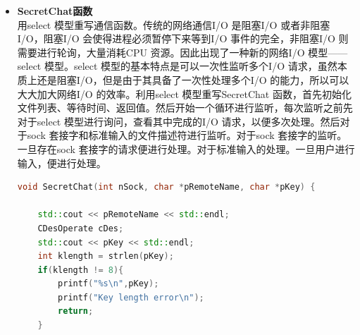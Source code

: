 \documentclass[UTF8,a4paper,10pt]{ctexart}
\begin{document}
\begin{itemize}
\begin{lstlisting}[language = C++]
      //negotiate key
      PublicKey cRsaPublicKey;
      CRsaOperate CRsaOperate;
      //CRsaOperate.show_par();
      cRsaPublicKey = CRsaOperate.GetPublicKey();
      if(send(nAcceptSocket, (char *)(&cRsaPublicKey), sizeof(cRsaPublicKey), 0) != sizeof(cRsaPublicKey)){
          perror("send");
          exit(0);
      }else{
          printf("successful send the RSA public key. \n");
      }
      unsigned long long nEncryptDesKey[4];
      char *strDesKey = new char[8];
      if(4*sizeof(unsigned long long) != TotalRecv(nAcceptSocket,(char *)nEncryptDesKey, 4*sizeof(unsigned long long),0)) {
          perror("TotalRecv DES key error");
          exit(0);
      }
      else {
          printf("successful get the DES key\n");
          unsigned short * pDesKey = (unsigned short *)strDesKey;
          for(int i = 0;i < 4; i++) {
              pDesKey[i] = CRsaOperate.Decry(nEncryptDesKey[i]);
              //cout << pDesKey[i] << endl;
          }
      }
      
      printf("Begin to chat...\n");
      SecretChat(nAcceptSocket,inet_ntoa(sRemoteAddr.sin_addr),strDesKey);
      close(nAcceptSocket);
  }
  \end{lstlisting}
  \item \textbf{SecretChat函数} \\ 
  用select 模型重写通信函数。传统的网络通信I/O 是阻塞I/O 或者非阻塞I/O，阻塞I/O 会使得进程必须暂停下来等到I/O 事件的完全，非阻塞I/O 则需要进行轮询，大量消耗CPU 资源。因此出现了一种新的网络I/O 模型——select 模型。select 模型的基本特点是可以一次性监听多个I/O 请求，虽然本质上还是阻塞I/O，但是由于其具备了一次性处理多个I/O 的能力，所以可以大大加大网络I/O 的效率。利用select 模型重写SecretChat 函数，首先初始化文件列表、等待时间、返回值。然后开始一个循环进行监听，每次监听之前先对于select 模型进行询问，查看其中完成的I/O 请求，以便多次处理。然后对于sock 套接字和标准输入的文件描述符进行监听。对于sock 套接字的监听。一旦存在sock 套接字的请求便进行处理。对于标准输入的处理。一旦用户进行输入，便进行处理。
  \begin{lstlisting}[language = C++]
void SecretChat(int nSock, char *pRemoteName, char *pKey) {

    std::cout << pRemoteName << std::endl;
    CDesOperate cDes;
    std::cout << pKey << std::endl;
    int klength = strlen(pKey);
    if(klength != 8){
        printf("%s\n",pKey);
        printf("Key length error\n");
        return;
    }


\end{lstlisting}
\end{itemize}
\end{document}
